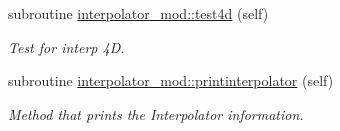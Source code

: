 \begin{DoxyCompactItemize}
subroutine \mbox{\hyperlink{namespaceinterpolator__mod_ac27ad06522b34071302dc09d10b0ec7e}{interpolator\+\_\+mod\+::test4d}} (self)
\begin{DoxyCompactList}\small\item\em Test for interp 4D. \end{DoxyCompactList}\item 
subroutine \mbox{\hyperlink{namespaceinterpolator__mod_a9b149bc8a3da5d1864b8c049f8b00697}{interpolator\+\_\+mod\+::printinterpolator}} (self)
\begin{DoxyCompactList}\small\item\em Method that prints the Interpolator information. \end{DoxyCompactList}\end{DoxyCompactItemize}
